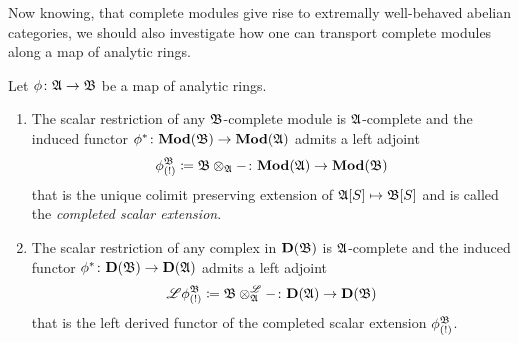 Now knowing, that complete modules give rise to extremally well-behaved abelian categories, we should also investigate how one can transport complete modules along a map of analytic rings.
\begin{proposition}
	\label{proposition: scalar restriction and extension of complete modules}
	
	Let $\phi\colon {\mathfrak{A}}\to {\mathfrak{B}}$ be a map of analytic rings.
	\begin{enumerate}
		\item
		The scalar restriction of any ${\mathfrak{B}}$-complete module is ${\mathfrak{A}}$-complete and the induced functor ${\phi^\ast}\colon {{\mathbf{Mod}}({\mathfrak{B}})}\to{{\mathbf{Mod}}({\mathfrak{A}})}$ admits a left adjoint
			$${\phi_{(!)}^{{\mathfrak{B}}}}\coloneqq {\mathfrak{B}}\otimes_{{\mathfrak{A}}}-\colon {{\mathbf{Mod}}({\mathfrak{A}})}\to{{\mathbf{Mod}}({\mathfrak{B}})}$$
		that is the unique colimit preserving extension of ${{{\mathfrak{A}}[S]}}\mapsto {{{\mathfrak{B}}[S]}}$ and is called the \emph{completed scalar extension}.
		
		
		\item
		The scalar restriction of any complex in ${{\mathbf{D}}({\mathfrak{B}})}$ is ${\mathfrak{A}}$-complete and the induced functor ${\phi^\ast}\colon {{\mathbf{D}}({\mathfrak{B}})}\to{{\mathbf{D}}({\mathfrak{A}})}$ admits a left adjoint
			$${\mathscr{L}\phi_{(!)}^{{\mathfrak{B}}}}\coloneqq {\mathfrak{B}}\otimes^{\mathscr{L}}_{\mathfrak{A}} -\colon {{\mathbf{D}}({\mathfrak{A}})}\to{{\mathbf{D}}({\mathfrak{B}})}$$
		that is the left derived functor of the completed scalar extension ${\phi_{(!)}^{{\mathfrak{B}}}}$.
		
	\end{enumerate}
\end{proposition}
